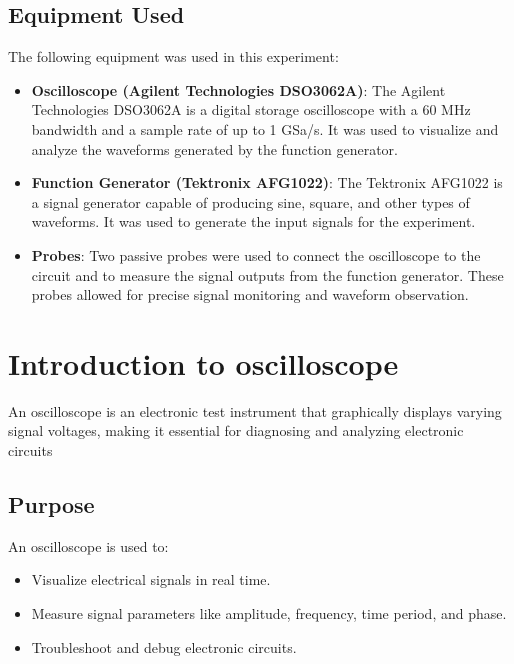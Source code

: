\documentclass[12pt]{article}
\begin{document}
\subsection{Equipment Used}

The following equipment was used in this experiment:

\begin{itemize}
    \item \textbf{Oscilloscope (Agilent Technologies DSO3062A)}: The Agilent Technologies DSO3062A is a digital storage oscilloscope with a 60 MHz bandwidth and a sample rate of up to 1 GSa/s. It was used to visualize and analyze the waveforms generated by the function generator. 
    
    \item \textbf{Function Generator (Tektronix AFG1022)}: The Tektronix AFG1022 is a signal generator capable of producing sine, square, and other types of waveforms. It was used to generate the input signals for the experiment. 
    
    \item \textbf{Probes}: Two passive probes were used to connect the oscilloscope to the circuit and to measure the signal outputs from the function generator. These probes allowed for precise signal monitoring and waveform observation.
\end{itemize}

\section{\textbf{Introduction to oscilloscope}}
An oscilloscope is an electronic test instrument that graphically displays varying signal voltages, making it essential for diagnosing and analyzing electronic circuits
\subsection{ Purpose}
An oscilloscope is used to:
\begin{itemize}
    \item Visualize electrical signals in real time.
    \item Measure signal parameters like amplitude, frequency, time period, and phase.
    \item Troubleshoot and debug electronic circuits.
\end{itemize}
\end{document}
